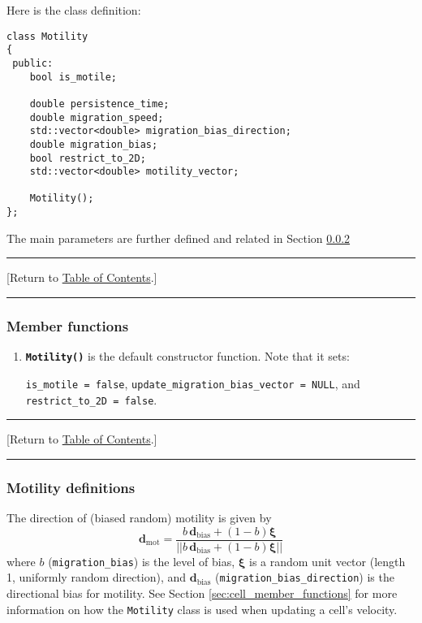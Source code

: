 \documentclass[12pt]{article}
\renewcommand{\vec}[1]{\mathbf{#1}}
\newcommand{\norm}[1]{\left|\left|{#1}\right|\right|}
\newcommand{\beq}{\begin{equation}}
\newcommand{\eeq}{\end{equation}}
\newcommand{\grvec}[1]{\boldsymbol{#1}}
\renewcommand{\v}{\verb}
\newcommand{\smallcode}[1]{\textbf{\texttt{#1}}}
\newcommand{\TOClink}{\begin{center}\hrule\vskip-5pt\phantom{.}\hfill[Return to \hyperlink{TOC}{Table of Contents}.]\hfill\phantom{.}\vskip3pt\hrule\end{center}}
\begin{document}
Here is the class definition: 
\begin{verbatim}
class Motility
{
 public:
    bool is_motile; 
 
    double persistence_time; 
    double migration_speed;     
    std::vector<double> migration_bias_direction; 
    double migration_bias; 
    bool restrict_to_2D; 
    std::vector<double> motility_vector; 
        
    Motility();      
};
\end{verbatim}
The main parameters are further defined and related in Section \ref{sec:motility_definitions}

\TOClink

\subsubsection{Member functions}
\begin{enumerate}
\item 
\smallcode{Motility()} is the default constructor function. Note that it sets: 

\v|is_motile = false|, \break
\v|update_migration_bias_vector = NULL|, and \hfill\break
\v|restrict_to_2D = false|. 

\end{enumerate}

\TOClink

\subsubsection{Motility definitions}
\label{sec:motility_definitions}

The direction of (biased random) motility is given by 
\beq
\vec{d}_\textrm{mot} = 
\frac{ b \, \vec{d}_\textrm{bias} + (1-b) \grvec{\xi} }{ \norm{  b \, \vec{d}_\textrm{bias} + (1-b) \grvec{\xi} } }
\label{eq:motility_direction}
\eeq
where $b$ (\v|migration_bias|) is the level of bias, 
$\grvec{\xi}$ is a random unit vector (length 1, uniformly random direction), 
and $\vec{d}_\textrm{bias}$ (\v|migration_bias_direction|) is the directional bias for motility. 
See Section \ref{sec:cell_member_functions} for more information on how the 
\v|Motility| class is used when updating a cell's velocity. 
\end{document}
